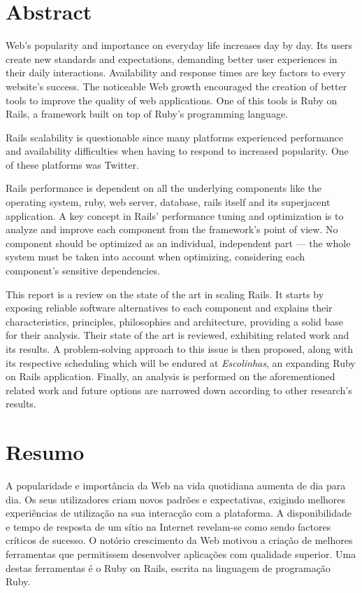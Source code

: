 \chapter*{Abstract}

Web's popularity and importance on everyday life increases day by day. Its users create new standards and expectations, demanding better user experiences in their daily interactions. Availability and response times are key factors to every website's success. The noticeable Web growth encouraged the creation of better tools to improve the quality of web applications. One of this tools is Ruby on Rails, a framework built on top of Ruby's programming language.

Rails scalability is questionable since many platforms experienced performance and availability difficulties when having to respond to increased popularity. One of these platforms was Twitter. 

Rails performance is dependent on all the underlying components like the operating system, ruby, web server, database, rails itself and its superjacent application. A key concept in Rails' performance tuning and optimization is to analyze and improve each component from the framework's point of view. No component should be optimized as an individual, independent part --- the whole system must be taken into account when optimizing, considering each component's sensitive dependencies.

This report is a review on the state of the art in scaling Rails. It starts by exposing reliable software alternatives to each component and explains their characteristics, principles, philosophies and architecture, providing a solid base for their analysis. Their state of the art is reviewed, exhibiting related work and its results. A problem-solving approach to this issue is then proposed, along with its respective scheduling which will be endured at \textit{Escolinhas}, an expanding Ruby on Rails application. Finally, an analysis is performed on the aforementioned related work and future options are narrowed down according to other research's results.

\chapter*{Resumo}

A popularidade e importância da Web na vida quotidiana aumenta de dia para dia. Os seus utilizadores criam novos padrões e expectativas, exigindo melhores experiências de utilização na sua interacção com a plataforma. A disponibilidade e tempo de resposta de um sítio na Internet revelam-se como sendo factores críticos de sucesso. O notório crescimento da Web motivou a criação de melhores ferramentas que permitissem desenvolver aplicações com qualidade superior. Uma destas ferramentas é o Ruby on Rails, escrita na linguagem de programação Ruby.

